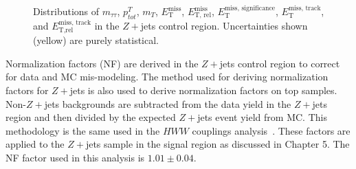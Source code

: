 \begin{figure}[!h]
{  }\hfill
  \hfill
{\caption{Distributions of $m_{\tau\tau}$, $p^T_{tot}$, $m_T$, $\ensuremath{E_{\text{T}}^{\text{miss}}}$, $\ensuremath{E_{\text{T, rel}}^{\text{miss}}}$, $\ensuremath{E_{\text{T}}^{\text{miss, significance}}}$, $\ensuremath{E_{\text{T}}^{\text{miss, track}}}$, and $\ensuremath{E_{\text{T,rel}}^{\text{miss, track}}}$ in the $Z+$jets control region. Uncertainties shown (yellow) are purely statistical. 
\label{fig:DYCR3}}}
\end{figure}

Normalization factors (NF) are derived in the $Z+$jets control region to correct for data and MC mis-modeling. The method used for deriving normalization factors for $Z+$jets is also used to derive normalization factors on top samples. Non-$Z+$jets backgrounds are subtracted from the data yield in the $Z+$jets region and then divided by the expected $Z+$jets event yield from MC. This methodology is the same used in the $HWW$ couplings analysis~\cite{Aaboud_2019}. These factors are applied to the $Z+$jets sample in the signal region as discussed in Chapter 5. The NF factor used in this analysis is $1.01 \pm 0.04$. 

